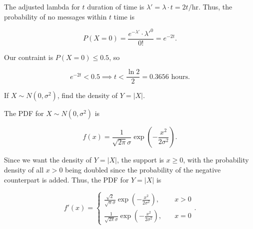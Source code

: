 \documentclass[answers]{exam}
\begin{document}
\begin{questions}
\begin{parts}
\begin{solution}
The adjusted lambda for $t$ duration of time is $\lambda' = \lambda \cdot t = 2t
/ \text{hr}$. Thus, the probability of no messages within $t$ time is

\[
P(X = 0) = \frac{e^{-\lambda'} \cdot \lambda'^{0}}{0!} = e^{-2t}
.\]  

Our contraint is $P(X=0) \le 0.5$, so

\[
e^{-2t} < 0.5 \implies t < \frac{\ln 2}{2} = 0.3656 \text{ hours}
.\] 
\end{solution}
\end{parts}

\question [15] If $X \sim N (0, \sigma^2)$, find the density of $Y=|X|$.

\begin{solution}
The PDF for $X \sim N(0, \sigma^2)$ is

\[
f(x) = \frac{1}{\sqrt{2\pi}\sigma} \exp \left( -\frac{x^2}{2\sigma^2} \right) 
.\] 

Since we want the density of $Y=|X|$, the support is $x \ge 0$, with the
probability density of all $x>0$ being doubled since the probability of the
negative counterpart is added. Thus, the PDF for $Y=|X|$ is

\[
f'(x) = \begin{cases}
\frac{\sqrt{2}}{\sqrt{\pi}\sigma} \exp \left( -\frac{x^2}{2\sigma^2} \right) , &\quad x > 0  \\ 
\frac{1}{\sqrt{2\pi}\sigma} \exp \left( -\frac{x^2}{2\sigma^2} \right) , &\quad x = 0
\end{cases}
.\] 
\end{solution}
\end{questions}
\end{document}
